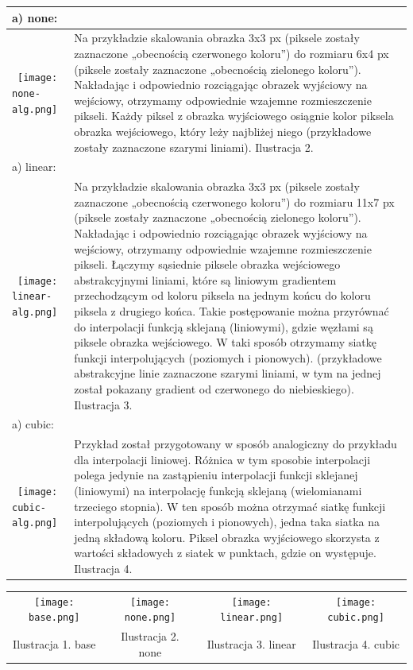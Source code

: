 \documentclass[a4paper,oneside,11pt]{report}
\begin{document}
\begin{table}[h]
\fontsize{8pt}{10pt}
\selectfont
\begin{tabular}{|p{3.4cm}|p{8.4cm}|} \hline
a) none:  & \\ \hline
\vspace \ \texttt{[image: none-alg.png]} &
Na przykładzie skalowania obrazka 3x3 px (piksele zostały zaznaczone „obecnością czerwonego koloru”) do rozmiaru 6x4 px (piksele zostały zaznaczone „obecnością zielonego koloru”). Nakładając i odpowiednio rozciągając obrazek wyjściowy na wejściowy, otrzymamy odpowiednie wzajemne rozmieszczenie pikseli. Każdy piksel z obrazka wyjściowego osiągnie kolor piksela obrazka wejściowego, który leży najbliżej niego (przykładowe zostały zaznaczone szarymi liniami). Ilustracja 2. \\ \hline
a) linear:  & \\ \hline
\vspace \ \texttt{[image: linear-alg.png]} &
Na przykładzie skalowania obrazka 3x3 px (piksele zostały zaznaczone „obecnością czerwonego koloru”) do rozmiaru 11x7 px (piksele zostały zaznaczone „obecnością zielonego koloru”). Nakładając i odpowiednio rozciągając obrazek wyjściowy na wejściowy, otrzymamy odpowiednie wzajemne rozmieszczenie pikseli. Łączymy sąsiednie piksele obrazka wejściowego abstrakcyjnymi liniami, które są liniowym gradientem przechodzącym od koloru piksela na jednym końcu do koloru piksela z drugiego końca. Takie postępowanie można przyrównać do interpolacji funkcją sklejaną (liniowymi), gdzie węzłami są piksele obrazka wejściowego. W taki sposób otrzymamy siatkę funkcji interpolujących (poziomych i pionowych). (przykładowe abstrakcyjne linie zaznaczone szarymi liniami, w tym na jednej został pokazany gradient od czerwonego do niebieskiego). Ilustracja 3. \\ \hline
a) cubic:  & \\ \hline
\vspace \ \texttt{[image: cubic-alg.png]} &
Przykład został przygotowany w sposób analogiczny do przykładu dla interpolacji liniowej. Różnica w tym sposobie interpolacji polega jedynie na zastąpieniu interpolacji funkcji sklejanej (liniowymi) na interpolację funkcją sklejaną (wielomianami trzeciego stopnia). W ten sposób można otrzymać siatkę funkcji interpolujących (poziomych i pionowych), jedna taka siatka na jedną składową koloru. Piksel obrazka wyjściowego skorzysta z wartości składowych z siatek w punktach, gdzie on występuje. Ilustracja 4. \\ \hline
\end{tabular}
\begin{tabular}{c c c c}
\texttt{[image: base.png]} &
\texttt{[image: none.png]} &
\texttt{[image: linear.png]} &
\texttt{[image: cubic.png]} \\
Ilustracja 1. base &
Ilustracja 2. none &
Ilustracja 3. linear &
Ilustracja 4. cubic \\
\end{tabular}
\end{table}
\end{document}
